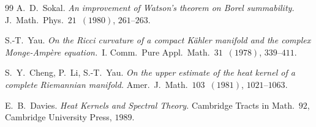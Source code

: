 \documentclass[11pt]{article}
\theoremstyle{definition}\newtheorem{definition}[theorem]{Definition}
\theoremstyle{remark}\newtheorem{remark}[theorem]{Remark}\newtheorem{example}[theorem]{Example}
\begin{document}
\begin{thebibliography}{99}
 A.~D.~Sokal.
\emph{An improvement of Watson's theorem on Borel summability.}
J.~Math.~Phys.~$21$~$(1980)$, $261$--$263$.

 S.-T.~Yau.
\emph{On the Ricci curvature of a compact K\"ahler manifold and the
complex Monge-Amp\`ere equation.}~I.
Comm.~Pure Appl.~Math.~$31$~$(1978)$, $339$--$411$.

 S.~Y.~Cheng, P.~Li, S.-T.~Yau.
\emph{On the upper estimate of the heat kernel of a complete
Riemannian manifold.} Amer.~J.~Math.~$103$~$(1981)$, $1021$--$1063$.

 E.~B.~Davies.
\emph{Heat Kernels and Spectral Theory.} Cambridge Tracts in Math.~$92$,
Cambridge University Press, $1989$.
\end{thebibliography}
\end{document}
